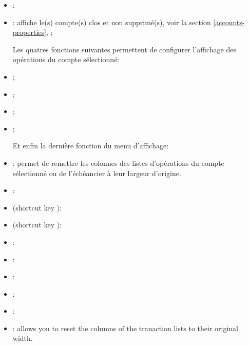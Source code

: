 \begin{itemize}
	\item {}:
	\item {}: affiche le(s) compte(s) clos et non supprimé(s), voir la section \vref{accounts-properties}, ;
	\begin{addmargin*}[-10pt]{0cm} 	%
		Les quatres fonctions suivantes permettent de configurer l'affichage des opérations du compte sélectionné:
	\end{addmargin*}
	\item {};
	\item {};
	\item {};
	\item {};
	\begin{addmargin*}[-10pt]{0cm} 	%
		Et enfin la dernière fonction du menu d'affichage:
	\end{addmargin*}	
	\item {}: permet de remettre les colonnes des listes d'opérations du compte sélectionné ou de l'échéancier à leur largeur d'origine.
\end{itemize}


\begin{itemize}
	 \item {}: 
	 \item {} (shortcut key ):
	 \item {} (shortcut key ):
	 \item {}:
	 \item {}:
	 \item {}:
	 \item {}:
	 \item {}:
	 \item {}: allows you to reset the columns of the tranaction lists to their original width.
\end{itemize}


